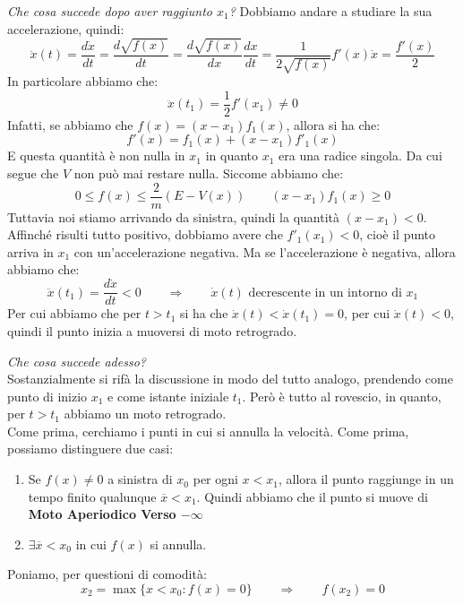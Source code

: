 \documentclass[11pt,a4paper,twoside]{article}
\theoremstyle{definition}
\begin{document}
\textit{Che cosa succede dopo aver raggiunto $x_1$?} Dobbiamo andare a studiare la sua accelerazione, quindi:
\[ \ddot x(t) = \frac{d\dot x}{dt} = \frac{d\sqrt{f(x)}}{dt} = \frac{d\sqrt{f(x)}}{dx}\frac{dx}{dt} = \frac{1}{2\sqrt{f(x)}}f'(x)\dot x = \frac{f'(x)}2 \]
In particolare abbiamo che:
\[ \ddot x(t_1) = \frac 12 f'(x_1)\neq 0 \]
Infatti, se abbiamo che $f(x) = (x-x_1)f_1(x)$, allora si ha che:
\[ f'(x) = f_1(x) + (x-x_1)f'_1(x) \]
E questa quantità è non nulla in $x_1$ in quanto $x_1$ era una radice singola. Da cui segue che $V$ non può mai restare nulla.
Siccome abbiamo che:
\[ 0 \leq f(x) \leq \frac 2m (E-V(x))\qquad (x-x_1)f_1(x) \geq 0 \]
Tuttavia noi stiamo arrivando da sinistra, quindi la quantità $(x-x_1)<0$. Affinché risulti tutto positivo, dobbiamo avere che $f'_1(x_1)<0$, cioè il punto arriva in $x_1$ con un'accelerazione negativa. Ma se l'accelerazione è negativa, allora abbiamo che:
\[ \ddot x(t_1) = \frac{d\dot x}{dt} <0 \qquad \Rightarrow \qquad \dot x(t) \text{ decrescente in un intorno di }x_1 \]
Per cui abbiamo che per $t>t_1$ si ha che $\dot x(t)< \dot x(t_1) = 0$, per cui $\dot x(t)<0$, quindi il punto inizia a muoversi di moto retrogrado.
\begin{center}
\end{center}
\textit{Che cosa succede adesso?}\\
Sostanzialmente si rifà la discussione in modo del tutto analogo, prendendo come punto di inizio $x_1$ e come istante iniziale $t_1$. Però è tutto al rovescio, in quanto, per $t>t_1$ abbiamo un moto retrogrado.\\
Come prima, cerchiamo i punti in cui si annulla la velocità. Come prima, possiamo distinguere due casi:
\begin{enumerate}
	\item Se $f(x)\neq 0$ a sinistra di $x_0$ per ogni $x<x_1$, allora il punto raggiunge in un tempo finito qualunque $\overline x< x_1$. Quindi abbiamo che il punto si muove di \textbf{Moto Aperiodico Verso $-\infty$}
	\item $\exists \overline x < x_0$ in cui $f(x)$ si annulla.
\end{enumerate}
Poniamo, per questioni di comodità:
\[ x_2 = \max \{x<x_0 : f(x)=0\} \qquad \Rightarrow \qquad f(x_2)=0\]
\end{document}
